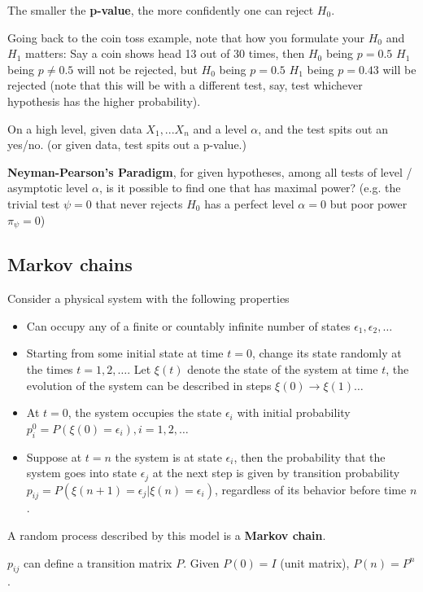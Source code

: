 \documentclass{article}
\begin{document}
The smaller the \textbf{p-value}, the more confidently one can reject $H_0$.

Going back to the coin toss example, note that how you formulate your $H_0$ and $H_1$ matters:
Say a coin shows head 13 out of 30 times, then
$H_0$ being $p = 0.5$ $H_1$ being $p \neq 0.5$ will not be rejected, but
$H_0$ being $p = 0.5$ $H_1$ being $p = 0.43$ will be rejected (note that this will be with a different test, say, test whichever hypothesis has the higher probability).

On a high level, given data $X_1, ... X_n$ and a level $\alpha$, and the test spits out an yes/no.
(or given data, test spits out a p-value.)

\textbf{Neyman-Pearson's Paradigm}, for given hypotheses, among all tests of level / asymptotic level $\alpha$, is it possible to find one that has maximal power?
(e.g. the trivial test $\psi = 0$ that never rejects $H_0$ has a perfect level $\alpha = 0$ but poor power $\pi_{\psi} = 0$)

\subsection{Markov chains}

Consider a physical system with the following properties

\begin{itemize}
  \item Can occupy any of a finite or countably infinite number of states $\epsilon_1, \epsilon_2, \dots$
  \item Starting from some initial state at time $t = 0$, change its state randomly at the times $t = 1, 2, \dots$. Let $\xi(t)$ denote the state of the system at time $t$, the evolution of the system can be described in steps $\xi(0) \to \xi(1) \dots$
  \item At $t = 0$, the system occupies the state $\epsilon_i$ with initial probability $p^0_i = P(\xi(0) = \epsilon_i), i = 1, 2, \dots$
  \item Suppose at $t = n$ the system is at state $\epsilon_i$, then the probability that the system goes into state $\epsilon_j$ at the next step is given by transition probability $p_{ij} = P(\xi(n + 1) = \epsilon_j | \xi(n) = \epsilon_i)$, regardless of its behavior before time $n$.
\end{itemize}

A random process described by this model is a \textbf{Markov chain}.

$p_{ij}$ can define a transition matrix $P$.
Given $P(0) = I$ (unit matrix), $P(n) = P^n$.
\end{document}
